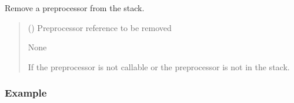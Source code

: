 \documentclass[letterpaper,10pt,english]{sphinxmanual}
\begin{document}
\begin{fulllineitems}
\begin{fulllineitems}
\label{\detokenize{preprocessor_stack:at_nlp.filters.preprocessor_stack.PreprocessorStack.remove}}
\pysigstartsignatures
{}
\pysigstopsignatures
\sphinxAtStartPar
Remove a preprocessor from the stack.
\begin{quote}\begin{description}
\sphinxAtStartPar
{} (\sphinxstyleliteralemphasis{\sphinxupquote{{[}}}\sphinxstyleliteralemphasis{\sphinxupquote{{[}}}\sphinxstyleliteralemphasis{\sphinxupquote{, }}\sphinxstyleliteralemphasis{\sphinxupquote{ | }}\sphinxstyleliteralemphasis{\sphinxupquote{{]}}}\sphinxstyleliteralemphasis{\sphinxupquote{, }}\sphinxstyleliteralemphasis{\sphinxupquote{{]}}}) \textendash{} Preprocessor reference to be removed

\sphinxAtStartPar
None

\sphinxAtStartPar
{} \textendash{} If the preprocessor is not callable or the preprocessor is not in the stack.

\end{description}\end{quote}
\subsubsection*{Example}


\end{fulllineitems}
\end{fulllineitems}
\end{document}
